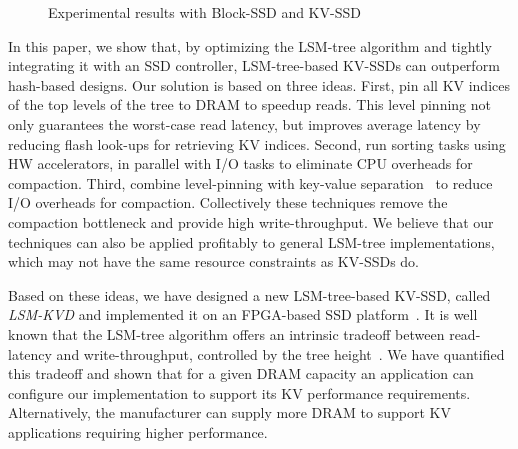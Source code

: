 \documentclass{abstract_hutech}
\newcommand{\ours}{LSM-KVD}
\begin{document}
\begin{figure}[t]
    \centering
    \caption{Experimental results with Block-SSD and KV-SSD}
    \label{fig:hash-kvssd-exp}\vspace{-13pt}
\end{figure}
In this paper, we show that, by optimizing the LSM-tree algorithm and tightly integrating it with an SSD controller, LSM-tree-based KV-SSDs can outperform hash-based designs.  
Our solution is based on three ideas.
First, pin all KV indices of the top levels of the tree to DRAM to speedup reads.
This level pinning not only guarantees the worst-case read latency, but improves average latency by reducing flash look-ups for retrieving KV indices.  
Second, run sorting tasks using HW accelerators, in parallel with I/O tasks to eliminate CPU overheads for compaction.
Third, combine level-pinning with key-value separation~\cite{wisckey} to reduce I/O overheads for compaction.
Collectively these techniques remove the compaction bottleneck and provide high write-throughput.
We believe that our techniques can also be applied profitably to general LSM-tree implementations, which may not have the same resource constraints as KV-SSDs do.

Based on these ideas, we have designed a new LSM-tree-based KV-SSD, called
\textit{\ours{}} and implemented it on an FPGA-based SSD
platform~\cite{bluedbm}. It is well known that the LSM-tree algorithm offers an intrinsic tradeoff between
read-latency and write-throughput, controlled by the tree height~\cite{dostoevsky,monkey}.  
We have quantified this tradeoff and shown that for
a given DRAM capacity an application can configure our implementation to
support its KV performance requirements.  Alternatively, the manufacturer can
supply more DRAM to support KV applications requiring higher performance.
\end{document}
